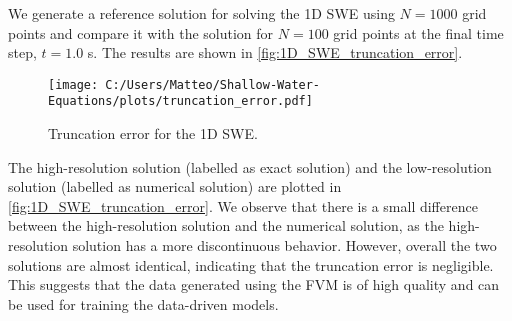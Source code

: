 We generate a reference solution for solving the 1D SWE using $N = 1000$ grid points and compare it with the solution for $N = 100$ grid points at the final time step, $t = 1.0$ s.
The results are shown in \autoref{fig:1D_SWE_truncation_error}.
\begin{figure}[H]
    \centering
    \texttt{[image: C:/Users/Matteo/Shallow-Water-Equations/plots/truncation\_error.pdf]}
    \caption{Truncation error for the 1D SWE.}\label{fig:1D_SWE_truncation_error}
\end{figure}
The high-resolution solution (labelled as exact solution) and the low-resolution solution (labelled as numerical solution) are plotted in \autoref{fig:1D_SWE_truncation_error}.
We observe that there is a small difference between the high-resolution solution and the numerical solution, as the high-resolution solution has a more discontinuous behavior.
However, overall the two solutions are almost identical, indicating that the truncation error is negligible.
This suggests that the data generated using the FVM is of high quality and can be used for training the data-driven models.

